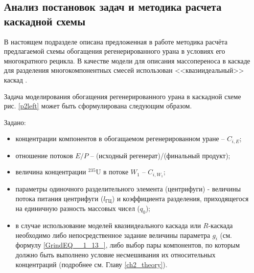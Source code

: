 
\subsection{Анализ постановок задач и методика расчета каскадной схемы}\label{statement}

В настоящем подразделе описана предложенная в работе методика расчёта предлагаемой схемы обогащения регенерированного урана в условиях его многократного рецикла. В качестве модели для описания массопереноса в каскаде для разделения многокомпонентных смесей использован <<квазиидеальный>> каскад \cite{sazykinKvaziidealnyeKaskadyDlya2000}. 

Задача моделирования обогащения регенерированного урана в каскадной схеме рис. \ref{p2left} может быть сформулирована следующим образом.

Задано:

\begin{itemize}
    \item концентрации компонентов в обогащаемом регенерированном уране -- $C_{i,{E}}$; 
    \item отношение потоков $E/P$ -- (исходный регенерат)/(финальный продукт);
    \item величина концентрации $^{235}$U в потоке $W_{1}$ -- $C_{i,{W_1}}$;
    \item параметры одиночного разделительного элемента (центрифуги) - величины потока питания центрифуги ($l_{ГЦ}$) и коэффициента разделения, приходящегося на единичную разность массовых чисел ($q_{0}$);
    \item в случае использование моделей квазиидеального каскада или $R$-каскада необходимо либо непосредственное задание величины параметра $g_i$ (см. формулу \ref{GrindEQ__1_13_}, либо выбор пары компонентов, по которым должно быть выполнено условие несмешивания их относительных концентраций (подробнее см. Главу \ref{ch2_theory}).
\end{itemize}

